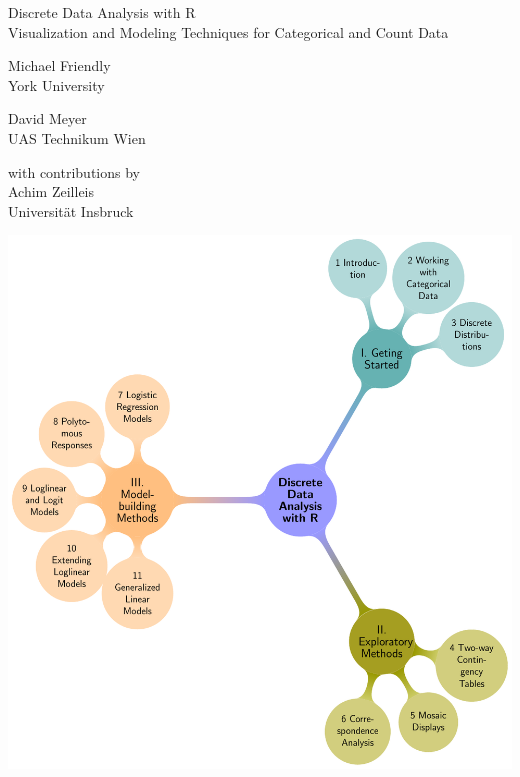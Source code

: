 \setcounter{page}{1}
\bigskip
\begin{center}
\Huge{Discrete Data Analysis with R} \\
\LARGE{Visualization and Modeling Techniques for Categorical and Count Data}
\end{center}
\bigskip
\bigskip

  \begin{minipage}[c]{.5\textwidth}
  	\begin{center}
   	{\Large Michael Friendly} \\ York University
   	\end{center}
   \end{minipage}%
  \hfill
  \begin{minipage}[c]{.5\textwidth}
		\begin{center}  
		{\Large David Meyer} \\ UAS Technikum Wien
   	\end{center}
  \end{minipage}

\bigskip
\begin{center}
with contributions by \\ {\Large Achim Zeilleis} \\ Universit\"at Insbruck
\end{center}

\bigskip
\bigskip
\bigskip
\begin{center}
	\includegraphics[width=.95\textwidth]{front/fig/tocmap}
\end{center}


